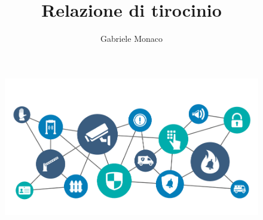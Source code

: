 \documentclass[a4paper,12pt]{article}
\title{\textbf{Relazione di tirocinio}}
\author{Gabriele Monaco}
\begin{document}
\maketitle

\begin{figure}[h]
  \includegraphics[width=\textwidth]{header}
\end{figure}

\newpage

\tableofcontents

\setlength{\emergencystretch}{15pt}
\setlength{\parindent}{0pt}

\newpage
\end{document}
